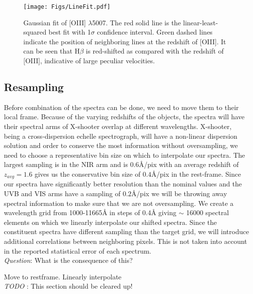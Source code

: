 \documentclass{aa}    %
\newcommand{\figlabel}[1]{\label{fig:#1}}
\newcommand{\sectlabel}[1]{\label{sect:#1}}
\newcommand{\todo}[3]{{\color{#2}\emph{#1}: #3}}
\newcommand{\jstodo}[1]{\todo{ \\TODO }{red}{#1}}
\newcommand{\qtodo}[1]{\todo{\\ Question}{red}{#1}}
\begin{document}
\begin{figure}[hbtp]
  \centering
  \texttt{[image: Figs/LineFit.pdf]}
  \caption[]{Gaussian fit of [OIII] $\lambda$5007. The red solid line is the linear-least-squared best fit with 1$\sigma$ confidence interval. Green dashed lines indicate the position of neighboring lines at the redshift of [OIII]. It can be seen that H$\beta$ is red-shifted as compared with the redshift of [OIII], indicative of large peculiar velocities.}
  \figlabel{linefit}
\end{figure}





\subsection{Resampling} \sectlabel{rebin}


Before combination of the spectra can be done, we need to move them to their local frame. Because of the varying redshifts of the objects, the spectra will have their spectral arms of X-shooter overlap at different wavelengths. X-shooter, being a cross-dispersion echelle spectrograph, will have a non-linear dispersion solution and order to conserve the most information without oversampling, we need to choose a representative bin size on which to interpolate our spectra. The largest sampling is in the NIR arm and is $0.6$\r{A}/pix with an average redshift of $z_{avg} = 1.6$ gives us the conservative bin size of $0.4$\r{A}/pix in the rest-frame. Since our spectra have significantly better resolution than the nominal values and the UVB and VIS arms have a sampling of $0.2$\r{A}/pix we will be throwing away spectral information to make sure that we are not oversampling. We create a wavelength grid from 1000-11665\r{A} in steps of 0.4\r{A} giving $\sim$ 16000 spectral elements on which we linearly interpolate our shifted spectra. Since the constituent spectra have different sampling than the target grid, we will introduce additional correlations between neighboring pixels. This is not taken into account in the reported statistical error of each spectrum.  \qtodo{What is the consequence of this?}


Move to restframe. Linearly interpolate \jstodo{This section should be cleared up!}
\end{document}
